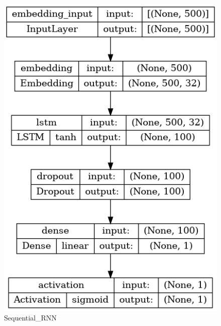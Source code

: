 \begin{figure}[!ht]
    \centering
    \begin{minipage}{0.5\textwidth}
        \centering
        \includegraphics[width=\linewidth]{obrazky-figures/model-plots/Sequential_RNN.png} %
        \caption{Sequential\_RNN}
    \end{minipage}\hfill
    \begin{minipage}{0.5\textwidth}
        \centering

\end{minipage}
\end{figure}

